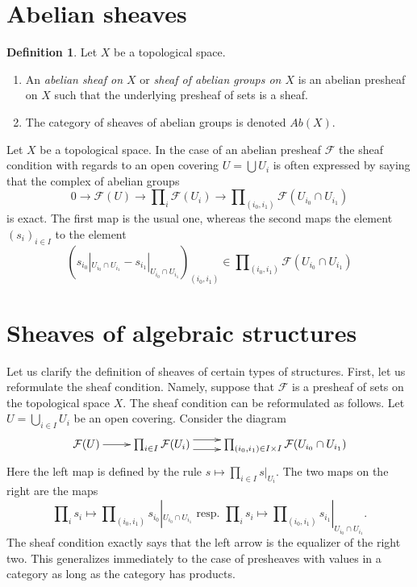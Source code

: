 \documentclass{stacks-project}
\theoremstyle{plain}
\theoremstyle{definition}
\newtheorem{definition}[subsection]{Definition}
\theoremstyle{remark}
\numberwithin{equation}{subsection}
\begin{document}
\section{Abelian sheaves}
\label{section-abelian-sheaves}

\begin{definition}
\label{definition-abelian-sheaf}
Let $X$ be a topological space.
\begin{enumerate}
\item An {\it abelian sheaf on $X$} or
{\it sheaf of abelian groups on $X$}
is an abelian presheaf on $X$ such that the underlying presheaf of
sets is a sheaf.
\item The category of sheaves of abelian groups
is denoted $\textit{Ab}(X)$.
\end{enumerate}
\end{definition}

\noindent
Let $X$ be a topological space.
In the case of an abelian presheaf $\mathcal{F}$ the sheaf
condition with regards to an open covering $U = \bigcup U_i$
is often expressed by saying that the complex of abelian groups
$$
0 \to \mathcal{F}(U)
\to \prod\nolimits_i \mathcal{F}(U_i)
\to \prod\nolimits_{(i_0, i_1)} \mathcal{F}(U_{i_0} \cap U_{i_1})
$$
is exact. The first map is the usual one, whereas the second
maps the element $(s_i)_{i \in I}$ to the element
$$
(
s_{i_0}|_{U_{i_0} \cap U_{i_1}} -
s_{i_1}|_{U_{i_0} \cap U_{i_1}}
)_{(i_0, i_1)}
\in \prod\nolimits_{(i_0, i_1)} \mathcal{F}(U_{i_0} \cap U_{i_1})
$$

\section{Sheaves of algebraic structures}
\label{section-sheaves-structures}

\noindent
Let us clarify the definition of sheaves of certain types of structures.
First, let us reformulate the sheaf condition. Namely, suppose that
$\mathcal{F}$ is a presheaf of sets on the topological space $X$.
The sheaf condition can be reformulated as follows. Let
$U = \bigcup_{i\in I} U_i$ be an open covering. Consider the
diagram
$$
\xymatrix{
\mathcal{F}(U) \ar[r]
&
\prod\nolimits_{i\in I}
\mathcal{F}(U_i)
\ar@<1ex>[r] \ar@<-1ex>[r]
&
\prod\nolimits_{(i_0, i_1) \in I \times I}
\mathcal{F}(U_{i_0} \cap U_{i_1})
}
$$
Here the left map is defined by the rule
$s \mapsto \prod_{i \in I} s|_{U_i}$. The two maps
on the right are the maps
$$
\prod\nolimits_i s_i
\mapsto
\prod\nolimits_{(i_0, i_1)} s_{i_0}|_{U_{i_0} \cap U_{i_1}}
\text{ resp. }
\prod\nolimits_i s_i
\mapsto
\prod\nolimits_{(i_0, i_1)} s_{i_1}|_{U_{i_0} \cap U_{i_1}}.
$$
The sheaf condition exactly says that the left arrow
is the equalizer of the right two. This generalizes
immediately to the case of presheaves with values in a
category as long as the category has products.
\end{document}
